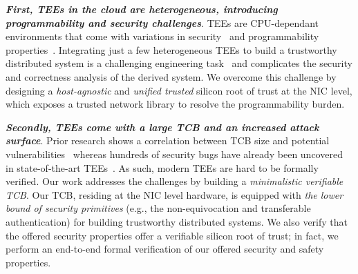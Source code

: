 
{\bf \em First, TEEs in the cloud are heterogeneous, introducing programmability and security challenges}. TEEs are CPU-dependant environments that come with variations in security~\cite{10.1145/3600160.3600169, 7807249, 10.1007/978-3-031-16092-9_7} and programmability properties~\cite{Baumann2014, scone, 10.1145/3079856.3080208, 10.1145/3460120.3485341, tsai2017graphene, Rkt-io}. Integrating just a few heterogeneous TEEs to build a trustworthy distributed system is a challenging engineering task~\cite{10.1145/3460120.3485341} and complicates the security and correctness analysis of the derived system. We overcome this challenge by designing a {\em host-agnostic} and {\em unified trusted} silicon root of trust at the NIC level, which exposes a trusted network library to resolve the programmability burden.


{\bf \em Secondly, TEEs come with a large TCB and an increased attack surface}. Prior research shows a correlation between TCB size and potential vulnerabilities~\cite{10.1145/3379469, 10.5555/1756748.1756832} whereas hundreds of security bugs have already been uncovered in state-of-the-art TEEs~\cite{10.1145/3456631}.  As such, modern TEEs are hard to be formally verified. Our work addresses the challenges by building a {\em minimalistic verifiable TCB}. Our TCB, residing at the NIC level hardware, is equipped with {\em the lower bound of security primitives} (e.g., the non-equivocation and transferable authentication) for building trustworthy distributed systems. We also verify that the offered security properties offer a verifiable silicon root of trust; in fact, we perform an end-to-end formal verification of our offered security and safety properties. 


